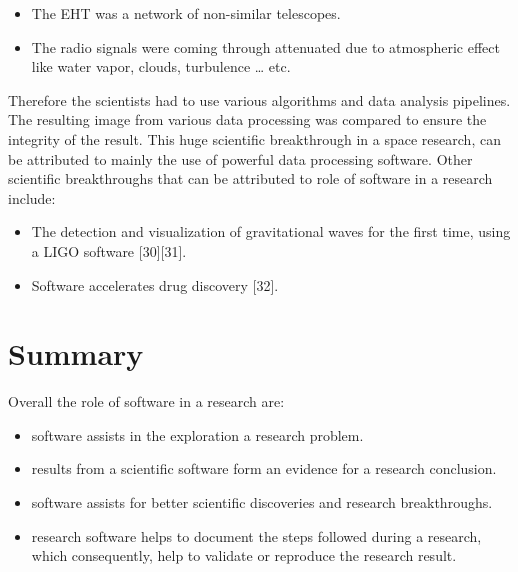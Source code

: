 \vspace{-5mm}   %
\begin{itemize}[noitemsep,topsep=0pt]
    \item The EHT was a network of non-similar telescopes.
    \item The radio signals were coming through attenuated due to atmospheric effect like water vapor, clouds, turbulence … etc.
\end{itemize}

Therefore the scientists had to use various algorithms and data analysis pipelines. The resulting image from various data processing was compared to ensure the integrity of the result. This huge scientific breakthrough in a space research, can be attributed to mainly the use of powerful data processing software. 
Other scientific breakthroughs that can be attributed to role of software in a research include:
\vspace{-5mm}   %
\begin{itemize}[noitemsep,topsep=0pt]
    \item The detection and visualization of gravitational waves for the first time, using a LIGO software [30][31]. 
    \item Software accelerates drug discovery [32].
\end{itemize}

\section{Summary}
Overall the role of software in a research are:
\vspace{-5mm}   %
\begin{itemize}[noitemsep,topsep=0pt]
    \item software assists in the exploration a research problem. 
    \item results from a scientific software form an evidence for a research conclusion.
    \item software assists for better scientific discoveries and research breakthroughs. 
    \item research software helps to document the steps followed during a research, which consequently, help to validate or reproduce the research result.
    
\end{itemize}